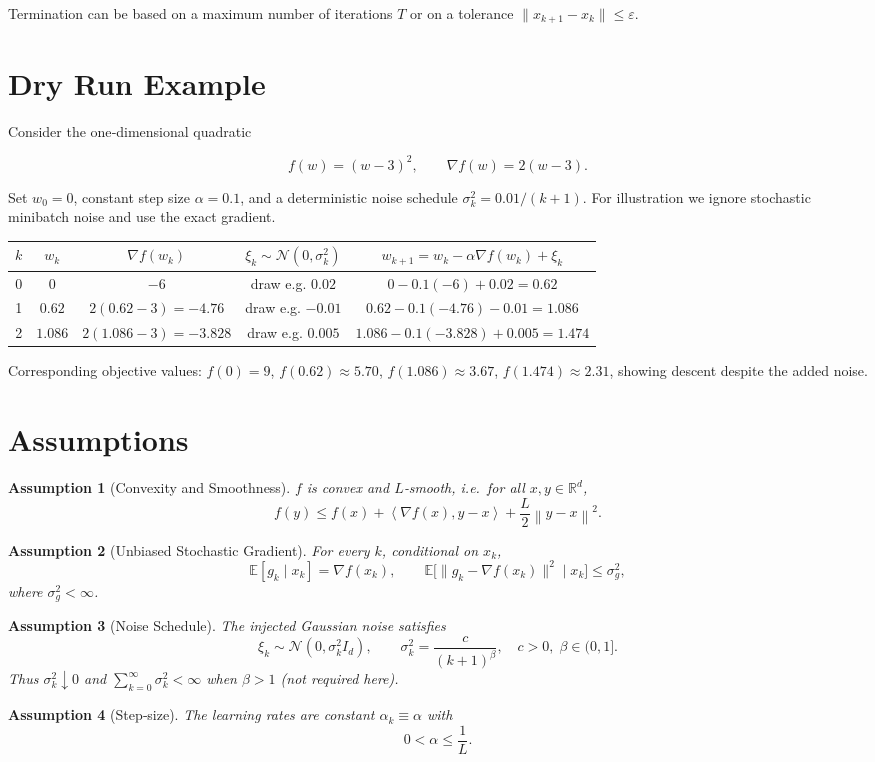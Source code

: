 \documentclass[11pt]{article}
\newtheorem{assumption}{Assumption}
\newcommand{\E}{\mathbb{E}}
\newcommand{\R}{\mathbb{R}}
\newcommand{\norm}[1]{\left\|#1\right\|}
\newcommand{\iprod}[2]{\left\langle #1,#2\right\rangle}
\begin{document}
Termination can be based on a maximum number of iterations $T$ or on a tolerance $\|x_{k+1}-x_{k}\|\le\varepsilon$.

\section*{Dry Run Example}
Consider the one‑dimensional quadratic  

\[
f(w)=(w-3)^{2},\qquad \nabla f(w)=2(w-3).
\]

Set $w_{0}=0$, constant step size $\alpha=0.1$, and a deterministic noise schedule $\sigma_{k}^{2}=0.01/(k+1)$.  
For illustration we ignore stochastic minibatch noise and use the exact gradient.

\begin{center}
\begin{tabular}{c|c|c|c|c}
$k$ & $w_{k}$ & $\nabla f(w_{k})$ & $\xi_{k}\sim\mathcal N(0,\sigma_{k}^{2})$ & $w_{k+1}=w_{k}-\alpha\nabla f(w_{k})+\xi_{k}$\\\hline
0 & $0$ & $-6$ & draw e.g. $0.02$ & $0-0.1(-6)+0.02=0.62$\\
1 & $0.62$ & $2(0.62-3)=-4.76$ & draw e.g. $-0.01$ & $0.62-0.1(-4.76)-0.01=1.086$\\
2 & $1.086$ & $2(1.086-3)=-3.828$ & draw e.g. $0.005$ & $1.086-0.1(-3.828)+0.005=1.474$\\
\end{tabular}
\end{center}

Corresponding objective values: $f(0)=9$, $f(0.62)\approx5.70$, $f(1.086)\approx3.67$, $f(1.474)\approx2.31$, showing descent despite the added noise.

\section*{Assumptions}
\begin{assumption}[Convexity and Smoothness]\label{ass:convex}
$f$ is convex and $L$‑smooth, i.e.~for all $x,y\in\R^{d}$,
\[
f(y)\le f(x)+\iprod{\nabla f(x)}{y-x}+\frac{L}{2}\norm{y-x}^{2}.
\tag{2}
\]
\end{assumption}
\begin{assumption}[Unbiased Stochastic Gradient]\label{ass:unbiased}
For every $k$, conditional on $x_{k}$,
\[
\E[g_{k}\mid x_{k}]=\nabla f(x_{k}),\qquad 
\E\big[\|g_{k}-\nabla f(x_{k})\|^{2}\mid x_{k}\big]\le \sigma_{g}^{2},
\tag{3}
\]
where $\sigma_{g}^{2}<\infty$.
\end{assumption}
\begin{assumption}[Noise Schedule]\label{ass:noise}
The injected Gaussian noise satisfies  
\[
\xi_{k}\sim\mathcal N(0,\sigma_{k}^{2}I_{d}),\qquad 
\sigma_{k}^{2}= \frac{c}{(k+1)^{\beta}},\quad c>0,\; \beta\in(0,1].
\tag{4}
\]
Thus $\sigma_{k}^{2}\downarrow 0$ and $\sum_{k=0}^{\infty}\sigma_{k}^{2}<\infty$ when $\beta>1$ (not required here).
\end{assumption}
\begin{assumption}[Step‑size]\label{ass:stepsize}
The learning rates are constant $\alpha_{k}\equiv\alpha$ with  
\[
0<\alpha\le \frac{1}{L}.
\tag{5}
\]
\end{assumption}
\end{document}
